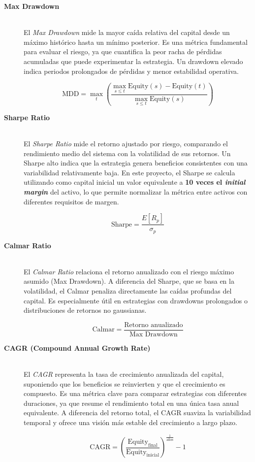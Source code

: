\begin{description}  
    \item[\textbf{Max Drawdown}]  \hfill \\
    El \textit{Max Drawdown} mide la mayor caída relativa del capital desde un máximo histórico hasta un mínimo posterior. Es una métrica fundamental
    para evaluar el riesgo, ya que cuantifica la peor racha de pérdidas acumuladas que puede experimentar la estrategia. Un drawdown elevado indica
    periodos prolongados de pérdidas y menor estabilidad operativa.

    \[\text{MDD} = \max_{t} \left( \frac{\max_{s \le t} \text{Equity}(s) - \text{Equity}(t)}{\max_{s \le t} \text{Equity}(s)} \right)\]

    \item[\textbf{Sharpe Ratio}]   \hfill \\
    El \textit{Sharpe Ratio} mide el retorno ajustado por riesgo, comparando el rendimiento medio del sistema con la volatilidad de sus retornos. Un
    Sharpe alto indica que la estrategia genera beneficios consistentes con una variabilidad relativamente baja. En este proyecto, el Sharpe se
    calcula utilizando como capital inicial un valor equivalente a \textbf{10 veces el \textit{initial margin}} del activo, lo que permite normalizar
    la métrica entre activos con diferentes requisitos de margen.

    \[\text{Sharpe} = \frac{E[R_p]}{\sigma_p}\]

    \item[\textbf{Calmar Ratio}]   \hfill \\
    El \textit{Calmar Ratio} relaciona el retorno anualizado con el riesgo máximo asumido (Max Drawdown). A diferencia del Sharpe, que se basa en la
    volatilidad, el Calmar penaliza directamente las caídas profundas del capital. Es especialmente útil en estrategias con drawdowns prolongados o
    distribuciones de retornos no gaussianas.

    \[\text{Calmar} = \frac{\text{Retorno anualizado}}{\text{Max Drawdown}}\]

    \item[\textbf{CAGR (Compound Annual Growth Rate)}] \hfill \\
    El \textit{CAGR} representa la tasa de crecimiento anualizada del capital, suponiendo que los beneficios se reinvierten y que el crecimiento es
    compuesto. Es una métrica clave para comparar estrategias con diferentes duraciones, ya que resume el rendimiento total en una única tasa anual
    equivalente. A diferencia del retorno total, el CAGR suaviza la variabilidad temporal y ofrece una visión más estable del crecimiento a largo
    plazo.

    \[\text{CAGR} = \left( \frac{\text{Equity}_{\text{final}}}{\text{Equity}_{\text{inicial}}} \right)^{\frac{1}{\text{años}}} - 1\]
\end{description}

